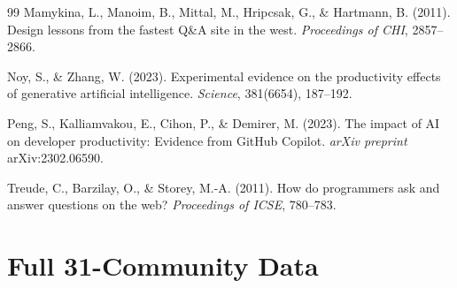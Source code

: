\documentclass[11pt,a4paper]{article}
\begin{document}
\begin{thebibliography}{99}
Mamykina, L., Manoim, B., Mittal, M., Hripcsak, G., \& Hartmann, B. (2011). Design lessons from the fastest Q\&A site in the west. \textit{Proceedings of CHI}, 2857--2866.

Noy, S., \& Zhang, W. (2023). Experimental evidence on the productivity effects of generative artificial intelligence. \textit{Science}, 381(6654), 187--192.

Peng, S., Kalliamvakou, E., Cihon, P., \& Demirer, M. (2023). The impact of AI on developer productivity: Evidence from GitHub Copilot. \textit{arXiv preprint} arXiv:2302.06590.

Treude, C., Barzilay, O., \& Storey, M.-A. (2011). How do programmers ask and answer questions on the web? \textit{Proceedings of ICSE}, 780--783.

\end{thebibliography}

\appendix

\section{Full 31-Community Data}
\label{app:communities}
\end{document}
